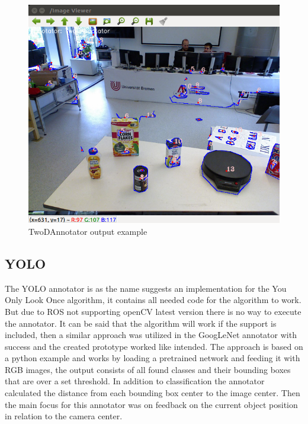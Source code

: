 \documentclass[main.tex]{subfiles}
\begin{document}
\begin{figure}[h]
\caption{TwoDAnnotator output example}
\centering
\includegraphics[width=1\textwidth]{pictures/perception/TwoDAnnotator.png}
\end{figure}
				\subsection{YOLO}
The YOLO annotator is as the name suggests an implementation for the You Only Look Once algorithm, it contains all needed code for the algorithm to work.
But due to ROS not supporting openCV latest version there is no way to execute the annotator. It can be said that the algorithm will work if the support is included, then a similar approach was utilized in the GoogLeNet annotator with success and the created prototype worked like intended.
The approach is based on a python example and works by loading a pretrained network and feeding it with RGB images, the output consists of all found classes and their bounding boxes that are over a set threshold.
In addition to classification the annotator calculated the distance from each bounding box center to the image center. Then the main focus for this annotator was on feedback on the current object position in relation to the camera center.
\end{document}
